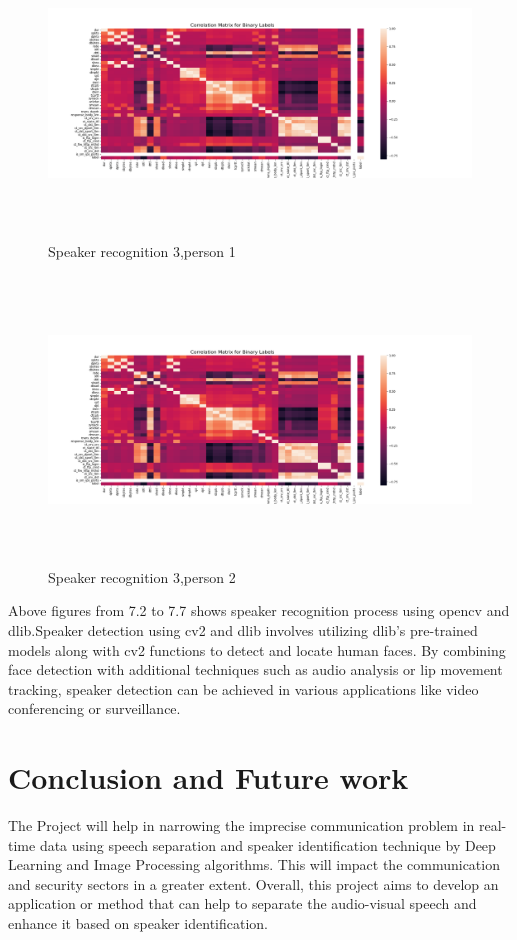 \documentclass[12pt,a4paper]{report}
\begin{document}
\begin{figure} [hbtp]
\centering
\includegraphics[width=5in,height=3in]{pic/correlation_matrix_bin.png}
\caption{Speaker recognition 3,person 1}
\end{figure}

\begin{figure} [hbtp]
\centering
\includegraphics[width=5in,height=3in]{pic/correlation_matrix_bin.png}
\caption{Speaker recognition 3,person 2}
\end{figure}
\newpage
\par Above figures from 7.2 to 7.7 shows speaker recognition process using opencv and dlib.Speaker detection using cv2 and dlib involves utilizing dlib's pre-trained models along with cv2 functions to detect and locate human faces. By combining face detection with additional techniques such as audio analysis or lip movement tracking, speaker detection can be achieved in various applications like video conferencing or surveillance.

\chapter{Conclusion and Future work}
The Project will help in narrowing the imprecise communication problem in real-time data using 
speech separation and speaker identification technique by Deep Learning and Image Processing 
algorithms. This will impact the communication and security sectors in a greater extent. Overall, this 
project aims to develop an application or method that can help to separate the audio-visual speech and 
enhance it based on speaker identification.
\end{document}
